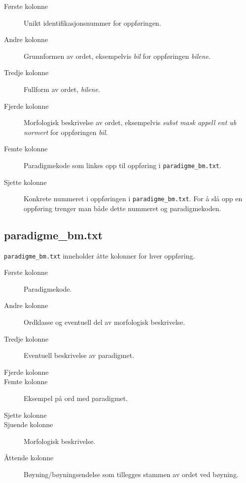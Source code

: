 \begin{description}
\item[Første kolonne] Unikt identifikasjonsnummer for oppføringen.
\item[Andre kolonne] Grunnformen av ordet, eksempelvis \textit{bil} for oppføringen \textit{bilene}.
\item[Tredje kolonne] Fullform av ordet, \textit{bilene}.
\item[Fjerde kolonne] Morfologisk beskrivelse av ordet, eksempelvis \textit{subst mask appell ent ub normert} for oppføringen \textit{bil}.
\item[Femte kolonne] Paradigmekode som linkes opp til oppføring i \texttt{paradigme\_bm.txt}. 
\item[Sjette kolonne] Konkrete nummeret i oppføringen i \texttt{paradigme\_bm.txt}. For å slå opp en oppføring trenger man både dette nummeret og paradigmekoden.
\end{description}

\subsection{paradigme\_bm.txt}

\texttt{paradigme\_bm.txt} inneholder åtte kolonner for hver oppføring.

\begin{description}
\item[Første kolonne] Paradigmekode.
\item[Andre kolonne] Ordklasse og eventuell del av morfologisk beskrivelse.
\item[Tredje kolonne] Eventuell beskrivelse av paradigmet. 
\item[Fjerde kolonne] 
\item[Femte kolonne] Eksempel på ord med paradigmet.
\item[Sjette kolonne] 
\item[Sjuende kolonne] Morfologisk beskrivelse.
\item[Åttende kolonne] Bøyning/bøyningsendelse som tillegges stammen av ordet ved bøyning. 
\end{description}
